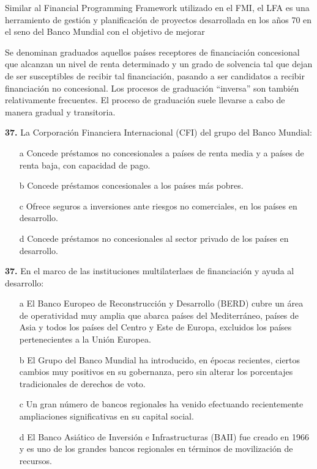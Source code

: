 \documentclass{nuevotema}
\begin{document}
\conceptos



Similar al Financial Programming Framework utilizado en el FMI, el LFA es una herramiento de gestión y planificación de proyectos desarrollada en los años 70 en el seno del Banco Mundial con el objetivo de mejorar 



Se denominan graduados aquellos países receptores de financiación concesional que alcanzan un nivel de renta determinado y un grado de solvencia tal que dejan de ser susceptibles de recibir tal financiación, pasando a ser candidatos a recibir financiación no concesional. Los procesos de graduación ``inversa'' son también relativamente frecuentes. El proceso de graduación suele llevarse a cabo de manera gradual y transitoria. 


\preguntas


\textbf{37.} La Corporación Financiera Internacional (CFI) del grupo del Banco Mundial:

\begin{itemize}
	\item[a] Concede préstamos no concesionales a países de renta media y a países de renta baja, con capacidad de pago.
	\item[b] Concede préstamos concesionales a los países más pobres.
	\item[c] Ofrece seguros a inversiones ante riesgos no comerciales, en los países en desarrollo.
	\item[d] Concede préstamos no concesionales al sector privado de los países en desarrollo.
\end{itemize}


\textbf{37.} En el marco de las instituciones multilaterlaes de financiación y ayuda al desarrollo:

\begin{itemize}
	\item[a] El Banco Europeo de Reconstrucción y Desarrollo (BERD) cubre un área de operatividad muy amplia que abarca países del Mediterráneo, países de Asia y todos los países del Centro y Este de Europa, excluidos los países pertenecientes a la Unión Europea.
	\item[b] El Grupo del Banco Mundial ha introducido, en épocas recientes, ciertos cambios muy positivos en su gobernanza, pero sin alterar los porcentajes tradicionales de derechos de voto.
	\item[c] Un gran número de bancos regionales ha venido efectuando recientemente ampliaciones significativas en su capital social.
	\item[d] El Banco Asiático de Inversión e Infrastructuras (BAII) fue creado en 1966 y es uno de los grandes bancos regionales en términos de movilización de recursos.
\end{itemize}
\end{document}
